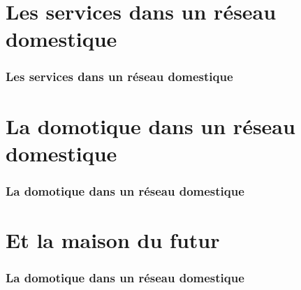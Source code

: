 \documentclass[handout]{beamer}
\begin{document}
\section{Les services dans un réseau domestique}
\begin{frame}\frametitle{Les services dans un réseau domestique} 
\end{frame}

\section{La domotique dans un réseau domestique}
\begin{frame}\frametitle{La domotique dans un réseau domestique} 
\end{frame}

\section{Et la maison du futur}
\begin{frame}\frametitle{La domotique dans un réseau domestique} 
\begin{figure}
    \centering
\end{figure}
\end{frame}
\end{document}

